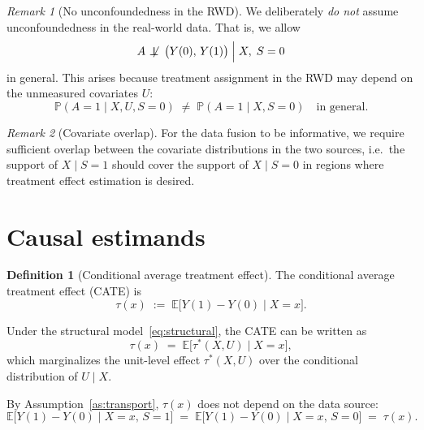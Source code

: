 \documentclass[10pt]{article}
\theoremstyle{plain}
\theoremstyle{definition}
\newtheorem{definition}{Definition}
\theoremstyle{remark}
\newtheorem{remark}{Remark}
\newcommand{\E}{\mathbb{E}}
\newcommand{\p}{\mathbb{P}}
\newcommand{\indep}{\perp\!\!\!\!\!\perp}
\newcommand{\CATE}{\tau}
\begin{document}
\begin{remark}[No unconfoundedness in the RWD]
  We deliberately \emph{do not} assume unconfoundedness in the real-world data. That is, we allow
  \begin{equation}\label{eq:confounded_rwd}
    A \;\not\!\indep\; \bigl(Y(0),\, Y(1)\bigr) \;\Big|\; X,\; S = 0
  \end{equation}
  in general. This arises because treatment assignment in the RWD may depend on the unmeasured covariates $U$:
  \begin{equation}\label{eq:rwd_treatment}
    \p(A = 1 \mid X, U, S = 0) \;\neq\; \p(A = 1 \mid X, S = 0) \quad \text{in general}.
  \end{equation}
\end{remark}

\begin{remark}[Covariate overlap]
  For the data fusion to be informative, we require sufficient overlap between the covariate distributions in the two sources, i.e.\ the support of $X \mid S=1$ should cover the support of $X \mid S=0$ in regions where treatment effect estimation is desired.
\end{remark}

\section{Causal estimands}

\begin{definition}[Conditional average treatment effect]
  The conditional average treatment effect (CATE) is
  \begin{equation}\label{eq:cate}
    \CATE(x) \;:=\; \E\bigl[Y(1) - Y(0) \mid X = x\bigr].
  \end{equation}
\end{definition}

\noindent Under the structural model~\eqref{eq:structural}, the CATE can be written as
\begin{equation}\label{eq:cate_structural}
  \CATE(x) \;=\; \E\bigl[\CATE^*(X, U) \mid X = x\bigr],
\end{equation}
which marginalizes the unit-level effect $\CATE^*(X,U)$ over the conditional distribution of $U \mid X$.

By Assumption~\ref{as:transport}, $\CATE(x)$ does not depend on the data source:
\begin{equation}\label{eq:cate_transport}
  \E\bigl[Y(1) - Y(0) \mid X = x,\, S = 1\bigr] 
  \;=\; \E\bigl[Y(1) - Y(0) \mid X = x,\, S = 0\bigr]
  \;=\; \CATE(x).
\end{equation}
\end{document}
